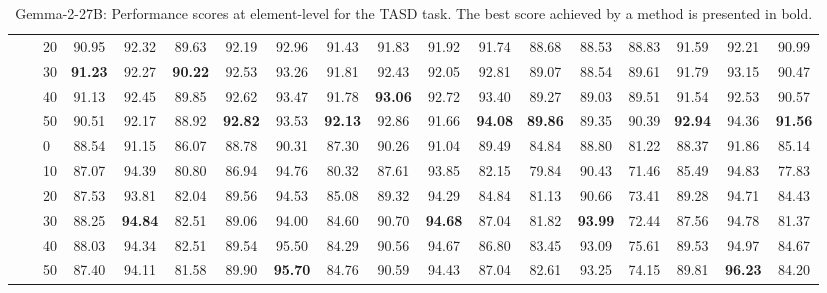 \begin{table*}[!h]
{\begin{tabular}{lllccc|ccc|ccc|ccc|ccc}
 \textbf{} & \textbf{} & 20 & 90.95 & 92.32 & 89.63 & 92.19 & 92.96 & 91.43 & 91.83 & 91.92 & 91.74 & 88.68 & 88.53 & 88.83 & 91.59 & 92.21 & 90.99 \\ 
 \textbf{} & \textbf{} & 30 & \textbf{91.23} & 92.27 & \textbf{90.22} & 92.53 & 93.26 & 91.81 & 92.43 & 92.05 & 92.81 & 89.07 & 88.54 & 89.61 & 91.79 & 93.15 & 90.47 \\ 
 \textbf{} & \textbf{} & 40 & 91.13 & 92.45 & 89.85 & 92.62 & 93.47 & 91.78 & \textbf{93.06} & 92.72 & 93.40 & 89.27 & 89.03 & 89.51 & 91.54 & 92.53 & 90.57 \\ 
 \textbf{} & \textbf{} & 50 & 90.51 & 92.17 & 88.92 & \textbf{92.82} & 93.53 & \textbf{92.13} & 92.86 & 91.66 & \textbf{94.08} & \textbf{89.86} & 89.35 & 90.39 & \textbf{92.94} & 94.36 & \textbf{91.56} \\ 
 \arrayrulecolor{gray}\cline{2-18}\arrayrulecolor{black}
\textbf{} & \textbf{\multirow{6}{*}{SC}} & 0 & 88.54 & 91.15 & 86.07 & 88.78 & 90.31 & 87.30 & 90.26 & 91.04 & 89.49 & 84.84 & 88.80 & 81.22 & 88.37 & 91.86 & 85.14 \\ 
 \textbf{} & \textbf{} & 10 & 87.07 & 94.39 & 80.80 & 86.94 & 94.76 & 80.32 & 87.61 & 93.85 & 82.15 & 79.84 & 90.43 & 71.46 & 85.49 & 94.83 & 77.83 \\ 
 \textbf{} & \textbf{} & 20 & 87.53 & 93.81 & 82.04 & 89.56 & 94.53 & 85.08 & 89.32 & 94.29 & 84.84 & 81.13 & 90.66 & 73.41 & 89.28 & 94.71 & 84.43 \\ 
 \textbf{} & \textbf{} & 30 & 88.25 & \textbf{94.84} & 82.51 & 89.06 & 94.00 & 84.60 & 90.70 & \textbf{94.68} & 87.04 & 81.82 & \textbf{93.99} & 72.44 & 87.56 & 94.78 & 81.37 \\ 
 \textbf{} & \textbf{} & 40 & 88.03 & 94.34 & 82.51 & 89.54 & 95.50 & 84.29 & 90.56 & 94.67 & 86.80 & 83.45 & 93.09 & 75.61 & 89.53 & 94.97 & 84.67 \\ 
 \textbf{} & \textbf{} & 50 & 87.40 & 94.11 & 81.58 & 89.90 & \textbf{95.70} & 84.76 & 90.59 & 94.43 & 87.04 & 82.61 & 93.25 & 74.15 & 89.81 & \textbf{96.23} & 84.20 \\ 
\hline
\end{tabular}
}
\caption{Gemma-2-27B: Performance scores at element-level for the TASD task. The best score achieved by a method is presented in bold.}\label{fig:performance-scores-element-tasd}
\end{table*}
\newpage


